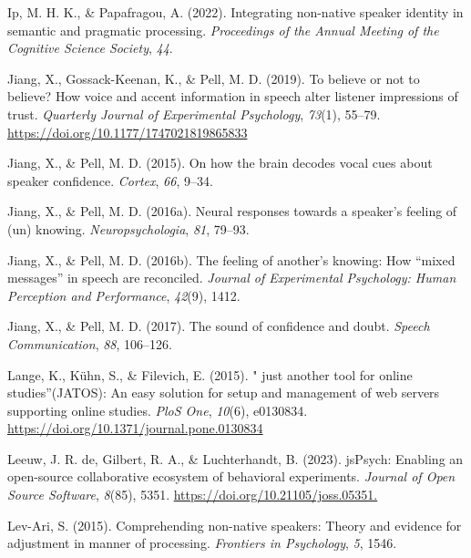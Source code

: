 \documentclass[
  man,floatsintext]{apa7}
\newlength{\cslhangindent}
\newlength{\cslentryspacingunit} %
\newenvironment{CSLReferences}[2] %
 {%
  \setlength{\parindent}{0pt}
  \ifodd #1
  \let\oldpar\par
  \def\par{\hangindent=\cslhangindent\oldpar}
  \fi
  \setlength{\parskip}{#2\cslentryspacingunit}
 }%
 {}
\begin{document}
\begin{CSLReferences}{1}{0}
\leavevmode{}%
Ip, M. H. K., \& Papafragou, A. (2022). Integrating non-native speaker identity in semantic and pragmatic processing. \emph{Proceedings of the Annual Meeting of the Cognitive Science Society}, \emph{44}.

\leavevmode{}%
Jiang, X., Gossack-Keenan, K., \& Pell, M. D. (2019). To believe or not to believe? {How voice and accent information in speech alter listener impressions of trust}. \emph{Quarterly Journal of Experimental Psychology}, \emph{73}(1), 55--79. \url{https://doi.org/10.1177/1747021819865833}

\leavevmode{}%
Jiang, X., \& Pell, M. D. (2015). On how the brain decodes vocal cues about speaker confidence. \emph{Cortex}, \emph{66}, 9--34.

\leavevmode{}%
Jiang, X., \& Pell, M. D. (2016a). Neural responses towards a speaker's feeling of (un) knowing. \emph{Neuropsychologia}, \emph{81}, 79--93.

\leavevmode{}%
Jiang, X., \& Pell, M. D. (2016b). The feeling of another's knowing: How {``mixed messages''} in speech are reconciled. \emph{Journal of Experimental Psychology: Human Perception and Performance}, \emph{42}(9), 1412.

\leavevmode{}%
Jiang, X., \& Pell, M. D. (2017). The sound of confidence and doubt. \emph{Speech Communication}, \emph{88}, 106--126.

\leavevmode{}%
Lange, K., Kühn, S., \& Filevich, E. (2015). " just another tool for online studies''(JATOS): An easy solution for setup and management of web servers supporting online studies. \emph{PloS One}, \emph{10}(6), e0130834. \url{https://doi.org/10.1371/journal.pone.0130834}

\leavevmode{}%
Leeuw, J. R. de, Gilbert, R. A., \& Luchterhandt, B. (2023). jsPsych: Enabling an open-source collaborative ecosystem of behavioral experiments. \emph{Journal of Open Source Software}, \emph{8}(85), 5351. \url{https://doi.org/10.21105/joss.05351.}

\leavevmode{}%
Lev-Ari, S. (2015). Comprehending non-native speakers: Theory and evidence for adjustment in manner of processing. \emph{Frontiers in Psychology}, \emph{5}, 1546.


\end{CSLReferences}
\end{document}
